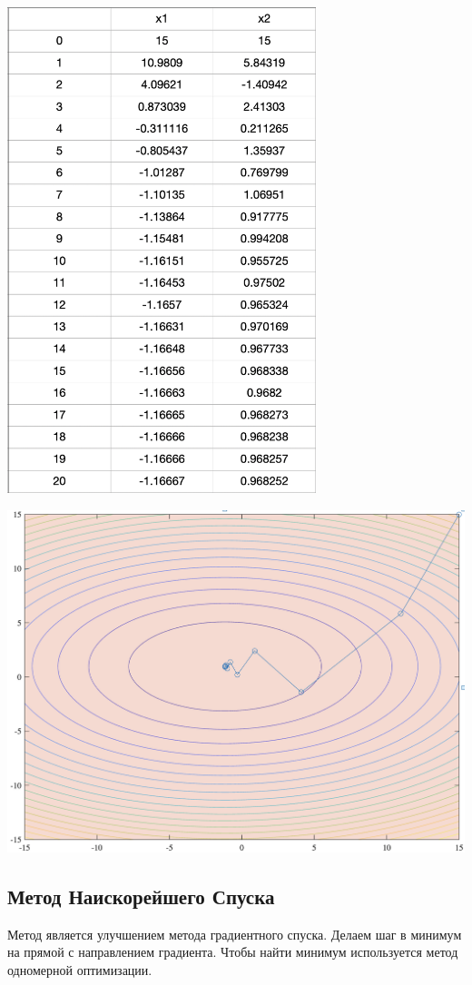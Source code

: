\documentclass[a4paper,12pt]{article}
\begin{document}
\begin{center}
    \includegraphics[width=90mm]{table_1.png}

    \includegraphics[width=150mm]{plot_1.png}
\end{center}


\clearpage

\subsection{Метод Наискорейшего Спуска}
Метод является улучшением метода градиентного спуска. Делаем шаг в минимум на прямой с направлением градиента. Чтобы найти минимум используется метод одномерной оптимизации.
\end{document}
